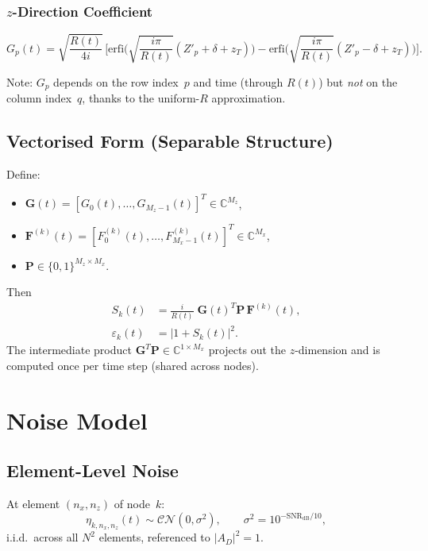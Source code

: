 \documentclass[11pt,a4paper]{article}
\newcommand{\C}{\mathbb{C}}
\newcommand{\erfi}{\mathrm{erfi}}
\begin{document}
\subsubsection{$z$-Direction Coefficient}
\begin{equation}
  G_p(t)
  = \sqrt{\frac{R(t)}{4i}}\,\biggl[
    \erfi\!\biggl(\sqrt{\frac{i\pi}{R(t)}}
    (Z'_p{+}\delta{+}z_T)\biggr)
  - \erfi\!\biggl(\sqrt{\frac{i\pi}{R(t)}}
    (Z'_p{-}\delta{+}z_T)\biggr)\biggr].
  \label{eq:Gp}
\end{equation}

Note: $G_p$ depends on the row index~$p$ and time (through $R(t)$)
but \emph{not} on the column index~$q$, thanks to the uniform-$R$
approximation.

\subsection{Vectorised Form (Separable Structure)}

Define:
\begin{itemize}
  \item $\mathbf{G}(t)=[G_0(t),\ldots,G_{M_z-1}(t)]^T
    \in\C^{M_z}$,
  \item $\mathbf{F}^{(k)}(t)=[F_0^{(k)}(t),\ldots,
    F_{M_x-1}^{(k)}(t)]^T\in\C^{M_x}$,
  \item $\mathbf{P}\in\{0,1\}^{M_z\times M_x}$.
\end{itemize}
Then
\begin{align}
  S_k(t) &= \frac{i}{R(t)}\;
  \mathbf{G}(t)^T\mathbf{P}\,\mathbf{F}^{(k)}(t),
  \label{eq:Sk}\\
  \varepsilon_k(t) &= |1+S_k(t)|^2.
  \label{eq:eps}
\end{align}
The intermediate product $\mathbf{G}^T\mathbf{P}\in\C^{1\times M_x}$
projects out the $z$-dimension and is computed once per time step
(shared across nodes).

\section{Noise Model}
\label{sec:noise}

\subsection{Element-Level Noise}

At element $(n_x,n_z)$ of node~$k$:
\begin{equation}
  \eta_{k,n_x,n_z}(t)\sim\mathcal{CN}(0,\sigma^2),
  \qquad\sigma^2=10^{-\mathrm{SNR}_{\mathrm{dB}}/10},
  \label{eq:noise}
\end{equation}
i.i.d.\ across all $N^2$ elements, referenced to $|A_D|^2=1$.
\end{document}
